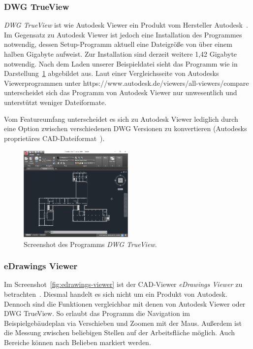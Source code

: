 \subsubsection{DWG TrueView}
\label{subsubsec:dwg-trueview}

\textit{DWG TrueView} ist wie Autodesk Viewer ein Produkt vom Hersteller Autodesk~\cite{DWGTrueView}.
Im Gegensatz zu Autodesk Viewer ist jedoch eine Installation des Programmes notwendig, dessen Setup-Programm aktuell eine Dateigröße von über einem halben Gigabyte aufweist.
Zur Installation sind derzeit weitere 1,42 Gigabyte notwendig.
Nach dem Laden unserer Beispieldatei sieht das Programm wie in Darstellung~\ref{fig:dwg-trueview} abgebildet aus.
Laut einer Vergleichsseite von Autodesks Viewerprogrammen unter https://www.autodesk.de/viewers/all-viewers/compare unterscheidet sich das Programm von Autodesk Viewer nur unwesentlich und unterstützt weniger Dateiformate.

Vom Featureumfang unterscheidet es sich zu Autodesk Viewer lediglich durch eine Option zwischen verschiedenen DWG Versionen zu konvertieren (Autodesks proprietäres CAD-Dateiformat~\cite{DWGTrueView}).

\begin{figure}
    \includegraphics[width=0.5\textwidth]{res/dwg-trueviewer.png}
    \caption{Screenshot des Programms \textit{DWG TrueView}.}
    \label{fig:dwg-trueview}
\end{figure}

\subsubsection{eDrawings Viewer}
\label{subsubsec:edrawings-viewer}

Im Screenshot~\ref{fig:edrawings-viewer} ist der CAD-Viewer \textit{eDrawings Viewer} zu betrachten~\cite{eDrawingsViewer}.
Diesmal handelt es sich nicht um ein Produkt von Autodesk.
Dennoch sind die Funktionen vergleichbar mit denen von Autodesk Viewer oder DWG TrueView.
So erlaubt das Programm die Navigation im Beispielgebäudeplan via Verschieben und Zoomen mit der Maus.
Außerdem ist die Messung zwischen beliebigen Stellen auf der Arbeitsfläche möglich.
Auch Bereiche können nach Belieben markiert werden.


